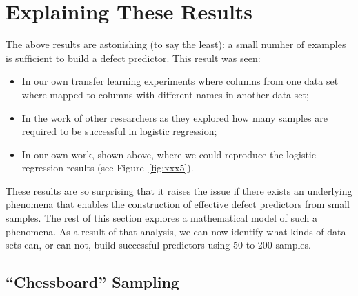 



\newcommand{\fig}[1]{Figure~\ref{fig:#1}}
\newcommand{\eq}[1]{Equation~\ref{eq:#1}}
\newcommand{\bi}{\begin{itemize}}
\newcommand{\ei}{\end{itemize}}

\section{Explaining These Results}

The above results are astonishing (to say the least): a small numher
of examples is sufficient to build a defect predictor. This result was seen:
\bi
\item In our own transfer learning experiments where columns from one data set where mapped to columns with different names in another data set;
\item In the work of other researchers as they explored how many samples are required to be successful in logistic regression;
\item In our own work, shown above, where we could reproduce the logistic regression results (see \fig{xxx5}).
\ei
These results are so surprising that it raises the issue if there exists an underlying phenomena that enables the construction
of effective defect predictors from small samples.  The rest of this section explores a mathematical model of such a phenomena.
As a result of that analysis, we can now identify what kinds of data sets can,  or can not, build successful predictors using 50 to 200 samples.

\subsection{``Chessboard'' Sampling}

